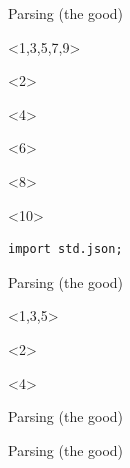 \documentclass[aspectratio=169,notes]{beamer}
\begin{document}
	\begin{frame}[fragile]{Parsing (the good)}
		\begin{onlyenv}<1,3,5,7,9>
			
		\end{onlyenv}
		\begin{onlyenv}<2>
			
		\end{onlyenv}
		\begin{onlyenv}<4>
			
		\end{onlyenv}
		\begin{onlyenv}<6>
			
		\end{onlyenv}
		\begin{onlyenv}<8>
			
		\end{onlyenv}
		\begin{onlyenv}<10>
			\begin{lstlisting}
import std.json;
			\end{lstlisting}
		\end{onlyenv}
	\end{frame}
	\begin{frame}[fragile]{Parsing (the good)}
		\begin{onlyenv}<1,3,5>
			
		\end{onlyenv}
		\begin{onlyenv}<2>
			
		\end{onlyenv}
		\begin{onlyenv}<4>
			
		\end{onlyenv}
	\end{frame}
	\begin{frame}[fragile]{Parsing (the good)}
		
	\end{frame}
	\begin{frame}[fragile]{Parsing (the good)}
		
	\end{frame}
\end{document}
